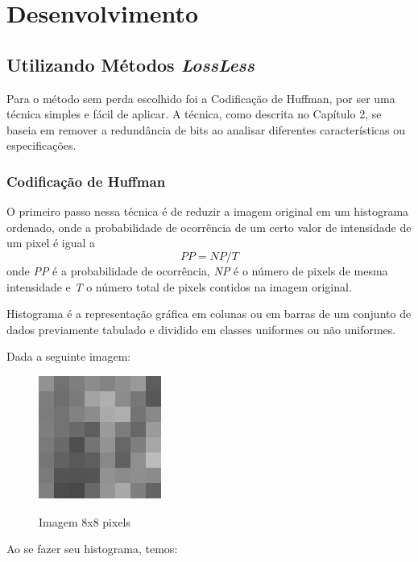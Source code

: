 \chapter{Desenvolvimento}
\label{c.desenvolvimento}

\section{Utilizando Métodos {\em LossLess}}
\label{s.losslessdev}

Para o método sem perda escolhido foi a Codificação de Huffman, por ser uma técnica simples e fácil de aplicar. A técnica, como descrita no Capítulo 2, se baseia em remover a redundância de bits ao analisar diferentes características ou especificações.

\subsection{Codificação de Huffman}
\label{ss.huffmandev}

O primeiro passo nessa técnica é de reduzir a imagem original em um histograma ordenado, onde a probabilidade de ocorrência de um certo valor de intensidade de um pixel é igual a \[ PP = NP / T \] onde {\em PP} é a probabilidade de ocorrência, {\em NP} é o número de pixels de mesma intensidade e {\em T} o número total de pixels contidos na imagem original.

Histograma é a representação gráfica em colunas ou em barras de um conjunto de dados previamente tabulado e dividido em classes uniformes ou não uniformes.

Dada a seguinte imagem:

\begin{figure}[h]
\caption{\small Imagem 8x8 pixels}
\centering
\includegraphics[scale=0.50]{figs/Input-Image-1.png}
\label{f.imagecompressionbasics}
\end{figure}

Ao se fazer seu histograma, temos:

